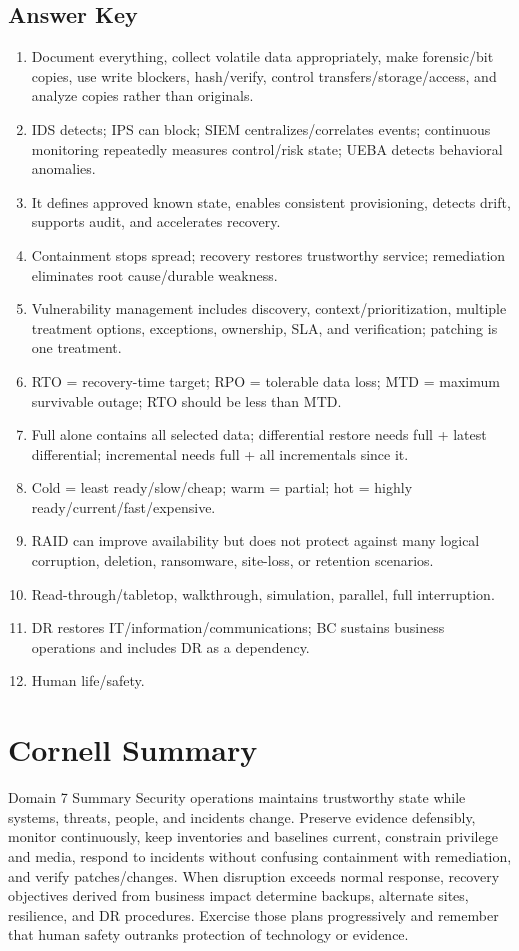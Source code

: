 \documentclass[10pt,letterpaper]{article}
\begin{document}
\subsection*{Answer Key}
\begin{enumerate}
\item Document everything, collect volatile data appropriately, make forensic/bit copies, use write blockers, hash/verify, control transfers/storage/access, and analyze copies rather than originals.
\item IDS detects; IPS can block; SIEM centralizes/correlates events; continuous monitoring repeatedly measures control/risk state; UEBA detects behavioral anomalies.
\item It defines approved known state, enables consistent provisioning, detects drift, supports audit, and accelerates recovery.
\item Containment stops spread; recovery restores trustworthy service; remediation eliminates root cause/durable weakness.
\item Vulnerability management includes discovery, context/prioritization, multiple treatment options, exceptions, ownership, SLA, and verification; patching is one treatment.
\item RTO = recovery-time target; RPO = tolerable data loss; MTD = maximum survivable outage; RTO should be less than MTD.
\item Full alone contains all selected data; differential restore needs full + latest differential; incremental needs full + all incrementals since it.
\item Cold = least ready/slow/cheap; warm = partial; hot = highly ready/current/fast/expensive.
\item RAID can improve availability but does not protect against many logical corruption, deletion, ransomware, site-loss, or retention scenarios.
\item Read-through/tabletop, walkthrough, simulation, parallel, full interruption.
\item DR restores IT/information/communications; BC sustains business operations and includes DR as a dependency.
\item Human life/safety.
\end{enumerate}

\section{Cornell Summary}
\begin{summarybox}{Domain 7 Summary}
Security operations maintains trustworthy state while systems, threats, people, and incidents change. Preserve evidence defensibly, monitor continuously, keep inventories and baselines current, constrain privilege and media, respond to incidents without confusing containment with remediation, and verify patches/changes. When disruption exceeds normal response, recovery objectives derived from business impact determine backups, alternate sites, resilience, and DR procedures. Exercise those plans progressively and remember that human safety outranks protection of technology or evidence.
\end{summarybox}
\end{document}

